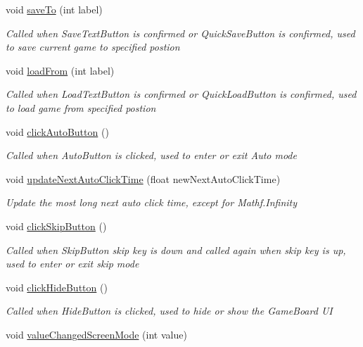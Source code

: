 \begin{DoxyCompactItemize}
void \hyperlink{class_world_control_ae3a4755061e4d6f6ceedd8f3717e12f4}{save\+To} (int label)
\begin{DoxyCompactList}\small\item\em Called when Save\+Text\+Button is confirmed or Quick\+Save\+Button is confirmed, used to save current game to specified postion \end{DoxyCompactList}\item 
void \hyperlink{class_world_control_ae3a0efa9d79d06955d91c9ce382f8ec0}{load\+From} (int label)
\begin{DoxyCompactList}\small\item\em Called when Load\+Text\+Button is confirmed or Quick\+Load\+Button is confirmed, used to load game from specified postion \end{DoxyCompactList}\item 
void \hyperlink{class_world_control_a5d0501e13fde299e5fb45f78c136a7b2}{click\+Auto\+Button} ()
\begin{DoxyCompactList}\small\item\em Called when Auto\+Button is clicked, used to enter or exit Auto mode \end{DoxyCompactList}\item 
void \hyperlink{class_world_control_a42843cbd7d89325d6fc9b7763b59193c}{update\+Next\+Auto\+Click\+Time} (float new\+Next\+Auto\+Click\+Time)
\begin{DoxyCompactList}\small\item\em Update the most long next auto click time, except for Mathf.\+Infinity \end{DoxyCompactList}\item 
void \hyperlink{class_world_control_aa8f73113a8f3ce8f41d6796099d2a31b}{click\+Skip\+Button} ()
\begin{DoxyCompactList}\small\item\em Called when Skip\+Button skip key is down and called again when skip key is up, used to enter or exit skip mode \end{DoxyCompactList}\item 
void \hyperlink{class_world_control_a77bee2bd9d38af266eda9028726a8526}{click\+Hide\+Button} ()
\begin{DoxyCompactList}\small\item\em Called when Hide\+Button is clicked, used to hide or show the Game\+Board UI \end{DoxyCompactList}\item 
void \hyperlink{class_world_control_a7e52bfc69634bd4d6ca536f93d6a1d8d}{value\+Changed\+Screen\+Mode} (int value)

\end{DoxyCompactItemize}
